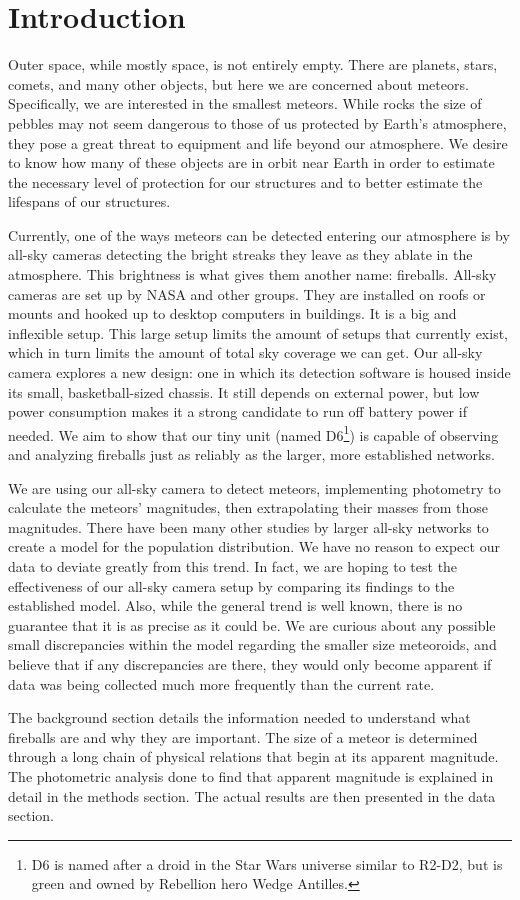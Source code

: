 \chapter{Introduction}

Outer space, while mostly space, is not entirely empty.  There are planets, stars, comets, and many other objects, but here we are concerned about meteors. Specifically, we are interested in the smallest meteors. While rocks the size of pebbles may not seem dangerous to those of us protected by Earth's atmosphere, they pose a great threat to equipment and life beyond our atmosphere. We desire to know how many of these objects are in orbit near Earth in order to estimate the necessary level of protection for our structures and to better estimate the lifespans of our structures.

Currently, one of the ways meteors can be detected entering our atmosphere is by all-sky cameras detecting the bright streaks they leave as they ablate in the atmosphere. This brightness is what gives them another name: fireballs. All-sky cameras are set up by NASA and other groups\cite{Jenniskens2011,Trigo-Rodriguez2007}. They are installed on roofs or mounts and hooked up to desktop computers in buildings. It is a big and inflexible setup. This large setup limits the amount of setups that currently exist, which in turn limits the amount of total sky coverage we can get. Our all-sky camera explores a new design: one in which its detection software is housed inside its small, basketball-sized chassis. It still depends on external power, but low power consumption makes it a strong candidate to run off battery power if needed. We aim to show that our tiny unit (named D6\footnote{D6 is named after a droid in the Star Wars universe similar to R2-D2, but is green and owned by Rebellion hero Wedge Antilles.}) is capable of observing and analyzing fireballs just as reliably as the larger, more established networks.

We are using our all-sky camera to detect meteors, implementing photometry to calculate the meteors' magnitudes, then extrapolating their masses from those magnitudes. There have been many other studies by larger all-sky networks to create a model for the population distribution. We have no reason to expect our data to deviate greatly from this trend. In fact, we are hoping to test the effectiveness of our all-sky camera setup by comparing its findings to the established model. Also, while the general trend is well known, there is no guarantee that it is as precise as it could be. We are curious about any possible small discrepancies within the model regarding the smaller size meteoroids, and believe that if any discrepancies are there, they would only become apparent if data was being collected much more frequently than the current rate.

The background section details the information needed to understand what fireballs are and why they are important. The size of a meteor is determined through a long chain of physical relations that begin at its apparent magnitude. The photometric analysis done to find that apparent magnitude is explained in detail in the methods section. The actual results are then presented in the data section.


